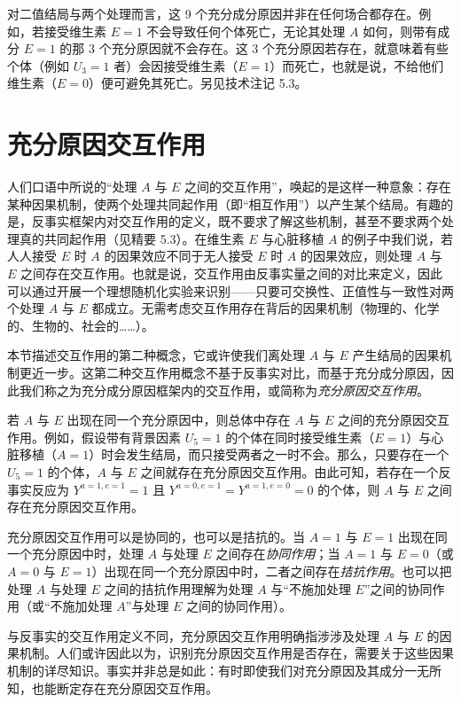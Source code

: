 
对二值结局与两个处理而言，这 9 个充分成分原因并非在任何场合都存在。例如，若接受维生素 $E=1$ 不会导致任何个体死亡，无论其处理 $A$ 如何，则带有成分 $E=1$ 的那 3 个充分原因就不会存在。这 3 个充分原因若存在，就意味着有些个体（例如 $U_3=1$ 者）会因接受维生素（$E=1$）而死亡，也就是说，不给他们维生素（$E=0$）便可避免其死亡。另见技术注记 5.3。

\section{充分原因交互作用}

人们口语中所说的“处理 $A$ 与 $E$ 之间的交互作用”，唤起的是这样一种意象：存在某种因果机制，使两个处理共同起作用（即“相互作用”）以产生某个结局。有趣的是，反事实框架内对交互作用的定义，既不要求了解这些机制，甚至不要求两个处理真的共同起作用（见精要 5.3）。在维生素 $E$ 与心脏移植 $A$ 的例子中我们说，若人人接受 $E$ 时 $A$ 的因果效应不同于无人接受 $E$ 时 $A$ 的因果效应，则处理 $A$ 与 $E$ 之间存在交互作用。也就是说，交互作用由反事实量之间的对比来定义，因此可以通过开展一个理想随机化实验来识别——只要可交换性、正值性与一致性对两个处理 $A$ 与 $E$ 都成立。无需考虑交互作用存在背后的因果机制（物理的、化学的、生物的、社会的……）。

本节描述交互作用的第二种概念，它或许使我们离处理 $A$ 与 $E$ 产生结局的因果机制更近一步。这第二种交互作用概念不基于反事实对比，而基于充分成分原因，因此我们称之为充分成分原因框架内的交互作用，或简称为\emph{充分原因交互作用}。

若 $A$ 与 $E$ 出现在同一个充分原因中，则总体中存在 $A$ 与 $E$ 之间的充分原因交互作用。例如，假设带有背景因素 $U_5=1$ 的个体在同时接受维生素（$E=1$）与心脏移植（$A=1$）时会发生结局，而只接受两者之一时不会。那么，只要存在一个 $U_5=1$ 的个体，$A$ 与 $E$ 之间就存在充分原因交互作用。由此可知，若存在一个反事实反应为 $Y^{a=1,e=1}=1$ 且 $Y^{a=0,e=1}=Y^{a=1,e=0}=0$ 的个体，则 $A$ 与 $E$ 之间存在充分原因交互作用。

充分原因交互作用可以是协同的，也可以是拮抗的。当 $A=1$ 与 $E=1$ 出现在同一个充分原因中时，处理 $A$ 与处理 $E$ 之间存在\emph{协同作用}；当 $A=1$ 与 $E=0$（或 $A=0$ 与 $E=1$）出现在同一个充分原因中时，二者之间存在\emph{拮抗作用}。也可以把处理 $A$ 与处理 $E$ 之间的拮抗作用理解为处理 $A$ 与“不施加处理 $E$”之间的协同作用（或“不施加处理 $A$”与处理 $E$ 之间的协同作用）。

与反事实的交互作用定义不同，充分原因交互作用明确指涉涉及处理 $A$ 与 $E$ 的因果机制。人们或许因此以为，识别充分原因交互作用是否存在，需要关于这些因果机制的详尽知识。事实并非总是如此：有时即使我们对充分原因及其成分一无所知，也能断定存在充分原因交互作用。

